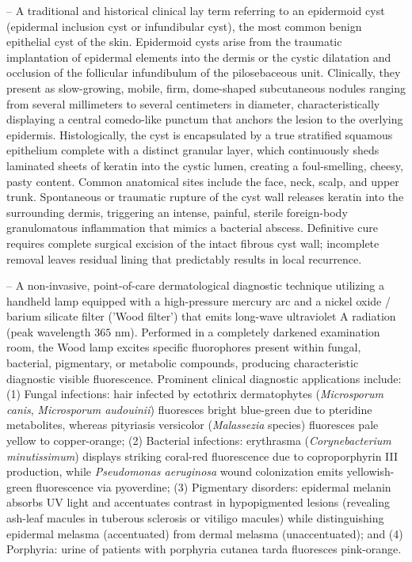-- A traditional and historical clinical lay term referring to an epidermoid cyst (epidermal inclusion cyst or infundibular cyst), the most common benign epithelial cyst of the skin. Epidermoid cysts arise from the traumatic implantation of epidermal elements into the dermis or the cystic dilatation and occlusion of the follicular infundibulum of the pilosebaceous unit. Clinically, they present as slow-growing, mobile, firm, dome-shaped subcutaneous nodules ranging from several millimeters to several centimeters in diameter, characteristically displaying a central comedo-like punctum that anchors the lesion to the overlying epidermis. Histologically, the cyst is encapsulated by a true stratified squamous epithelium complete with a distinct granular layer, which continuously sheds laminated sheets of keratin into the cystic lumen, creating a foul-smelling, cheesy, pasty content. Common anatomical sites include the face, neck, scalp, and upper trunk. Spontaneous or traumatic rupture of the cyst wall releases keratin into the surrounding dermis, triggering an intense, painful, sterile foreign-body granulomatous inflammation that mimics a bacterial abscess. Definitive cure requires complete surgical excision of the intact fibrous cyst wall; incomplete removal leaves residual lining that predictably results in local recurrence.

-- A non-invasive, point-of-care dermatological diagnostic technique utilizing a handheld lamp equipped with a high-pressure mercury arc and a nickel oxide / barium silicate filter ('Wood filter') that emits long-wave ultraviolet A radiation (peak wavelength $365\text{ nm}$). Performed in a completely darkened examination room, the Wood lamp excites specific fluorophores present within fungal, bacterial, pigmentary, or metabolic compounds, producing characteristic diagnostic visible fluorescence. Prominent clinical diagnostic applications include: (1) Fungal infections: hair infected by ectothrix dermatophytes (\textit{Microsporum canis}, \textit{Microsporum audouinii}) fluoresces bright blue-green due to pteridine metabolites, whereas pityriasis versicolor (\textit{Malassezia} species) fluoresces pale yellow to copper-orange; (2) Bacterial infections: erythrasma (\textit{Corynebacterium minutissimum}) displays striking coral-red fluorescence due to coproporphyrin III production, while \textit{Pseudomonas aeruginosa} wound colonization emits yellowish-green fluorescence via pyoverdine; (3) Pigmentary disorders: epidermal melanin absorbs UV light and accentuates contrast in hypopigmented lesions (revealing ash-leaf macules in tuberous sclerosis or vitiligo macules) while distinguishing epidermal melasma (accentuated) from dermal melasma (unaccentuated); and (4) Porphyria: urine of patients with porphyria cutanea tarda fluoresces pink-orange.

